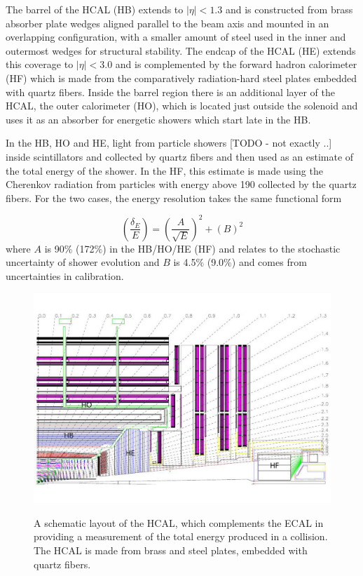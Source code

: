 The barrel of the HCAL (HB) extends to $|\eta|<1.3$ 
 and is constructed from brass absorber plate wedges aligned parallel 
 to the beam axis and mounted in an overlapping configuration,
 with a smaller amount of steel used in the inner and outermost
 wedges for structural stability.
The endcap of the HCAL (HE) extends this coverage to $|\eta|<3.0$
 and is complemented by the forward hadron calorimeter (HF)
 which is made from the comparatively radiation-hard 
 steel plates embedded with quartz fibers.
Inside the barrel region there is an additional layer of the
 HCAL, the outer calorimeter (HO), which is located just
 outside the solenoid and uses it as an absorber 
 for energetic showers which start late in the HB.

In the HB, HO and HE, light from particle showers
 [TODO - not exactly ..] 
 inside scintillators and collected by quartz fibers
 and then used as an estimate of the total energy of the shower.
In the HF, this estimate is made using the Cherenkov 
 radiation from particles with energy above 190 \keV
 collected by the quartz fibers.
For the two cases, the energy resolution takes the same
 functional form 

\begin{equation}\label{eq:hcal_res}
 \left(\frac{\delta_E}{E}\right) =  \left(\frac{A}{\sqrt{E}}\right)^2 + (B)^2 
\end{equation}
 where $A$ is 90$\%$ (172$\%$) in the HB/HO/HE (HF)
  and relates to the stochastic uncertainty of shower evolution
 and $B$ is 4.5$\%$ (9.0$\%$) and comes from uncertainties in calibration.


\begin{figure}[tb]
\caption[The CMS Hadronic Calorimeter]{
 A schematic layout of the HCAL, which complements the ECAL
  in providing a measurement of the total energy produced 
  in a collision.
 The HCAL is made from brass and steel plates,
  embedded with quartz fibers.
 }
\includegraphics[width=\textwidth]{pdfs/experiment/cms_hcal.pdf}
\label{fig:hcal}
\end{figure}
 

